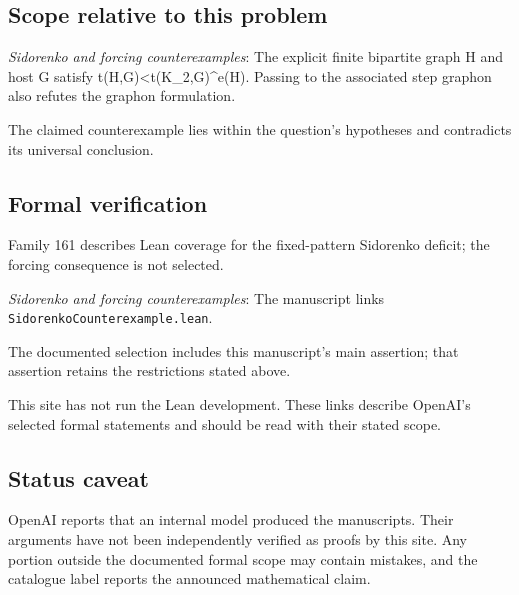 \documentclass[11pt]{article}
\begin{document}
\subsection{Scope relative to this problem}
\textit{Sidorenko and forcing counterexamples}: The explicit finite bipartite graph H and host G satisfy t(H,G)<t(K\_2,G)\textasciicircum{}e(H). Passing to the associated step graphon also refutes the graphon formulation.

The claimed counterexample lies within the question’s hypotheses and contradicts its universal conclusion.

\subsection{Formal verification}
Family 161 describes Lean coverage for the fixed-pattern Sidorenko deficit; the forcing consequence is not selected.

\textit{Sidorenko and forcing counterexamples}: The manuscript links \texttt{SidorenkoCounterexample.lean}.

The documented selection includes this manuscript’s main assertion; that assertion retains the restrictions stated above.

This site has not run the Lean development. These links describe OpenAI’s selected formal statements and should be read with their stated scope.

\subsection{Status caveat}
OpenAI reports that an internal model produced the manuscripts. Their arguments have not been independently verified as proofs by this site. Any portion outside the documented formal scope may contain mistakes, and the catalogue label reports the announced mathematical claim.
\end{document}
